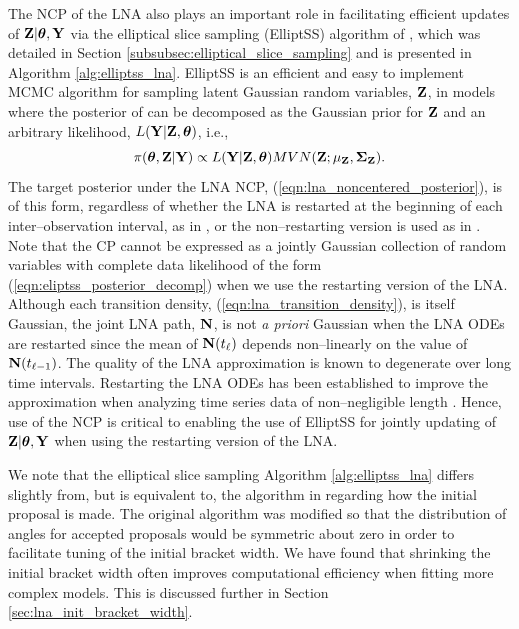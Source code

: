 The NCP of the LNA also plays an important role in facilitating efficient updates of $ \mathbf{Z}|\boldsymbol{\theta},\mathbf{Y} $ via the elliptical slice sampling (ElliptSS) algorithm of \cite{murray2010}, which was detailed in Section \ref{subsubsec:elliptical_slice_sampling} and is presented in Algorithm \ref{alg:elliptss_lna}. ElliptSS is an efficient and easy to implement MCMC algorithm for sampling latent Gaussian random variables, $ \mathbf{Z} $, in models where the posterior of can be decomposed as the Gaussian prior for $ \mathbf{Z} $ and an arbitrary likelihood, $ L(\mathbf{Y}|\mathbf{Z},\boldsymbol{\theta}) $, i.e.,
\begin{equation}
\label{eqn:eliptss_posterior_decomp}
\pi(\boldsymbol{\theta},\mathbf{Z}|\mathbf{Y})\propto L(\mathbf{Y}|\mathbf{Z},\boldsymbol{\theta})MVN(\mathbf{Z};\mu_{\mathbf{Z}},\boldsymbol{\Sigma}_{\mathbf{Z}}).
\end{equation}
The target posterior under the LNA NCP, (\ref{eqn:lna_noncentered_posterior}), is of this form, regardless of whether the LNA is restarted at the beginning of each inter--observation interval, as in \cite{fearnhead2014}, or the non--restarting version is used as in \cite{komorowski2009}. Note that the CP cannot be expressed as a jointly Gaussian collection of random variables with complete data likelihood of the form (\ref{eqn:eliptss_posterior_decomp}) when we use the restarting version of the LNA. Although each transition density, (\ref{eqn:lna_transition_density}), is itself Gaussian, the joint LNA path, $ \mathbf{N} $, is not \textit{a priori} Gaussian when the LNA ODEs are restarted since the mean of $ \mathbf{N}(t_\ell) $ depends non--linearly on the value of $ \mathbf{N}(t_{\ell-1}) $. The quality of the LNA approximation is known to degenerate over long time intervals. Restarting the LNA ODEs has been established to improve the approximation when analyzing time series data of non--negligible length \cite{fearnhead2014,giagos2010inference}. Hence, use of the NCP is critical to enabling the use of ElliptSS for jointly updating of $ \mathbf{Z}|\boldsymbol{\theta},\mathbf{Y} $ when using the restarting version of the LNA. 

We note that the elliptical slice sampling Algorithm \ref{alg:elliptss_lna} differs slightly from, but is equivalent to, the algorithm in \cite{murray2010} regarding how the initial proposal is made. The original algorithm was modified so that the distribution of angles for accepted proposals would be symmetric about zero in order to facilitate tuning of the initial bracket width. We have found that shrinking the initial bracket width often improves computational efficiency when fitting more complex models. This is discussed further in Section \ref{sec:lna_init_bracket_width}.

